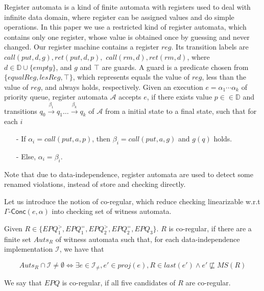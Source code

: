 Register automata is a kind of finite automata with registers used to deal with infinite data domain, where register can be assigned values and do simple operations. In this paper we use a restricted kind of register automata, which contains only one register, whose value is obtained once by guessing and never changed. Our register machine contains a register $\textit{reg}$. Its transition labels are $\textit{call}(\textit{put},d,g), \textit{ret}(\textit{put},d,p),$ $\textit{call}(\textit{rm},d),\textit{ret}(\textit{rm},d)$, where $d \in \mathbb{D} \cup \{ \textit{empty} \}$, and $g$ and $\top$ are guards. A guard is a predicate chosen from $\{\textit{equalReg},\textit{lesReg},\top \}$, which represents equals the value of $\textit{reg}$, less than the value of $\textit{reg}$, and always holds, respectively. Given an execution $e = \alpha_1 \cdots \alpha_k$ of priority queue, register automata $\mathcal{A}$ accepts $e$, if there exists value $p \in \in \mathbb{D}$ and transitions $q_0 \xrightarrow{\beta_1} q_1 \ldots \xrightarrow{\beta_k} q_k$ of $\mathcal{A}$ from a initial state to a final state, such that for each $i$

\begin{itemize}
\setlength{\itemsep}{0.5pt}
\item[-] If $\alpha_i = \textit{call}(\textit{put},a,p)$, then $\beta_i= \textit{call}(\textit{put},a,g)$ and $g(q)$ holds. 

\item[-] Else, $\alpha_i = \beta_i$. 
\end{itemize}

Note that due to data-independence, register automata are used to detect some renamed violations, instead of store and checking directly. 




Let us introduce the notion of co-regular, which reduce checking linearizable w.r.t $\Gamma\mathsf{\text{-}Conc}(e,\alpha)$ into checking set of witness automata.

\begin{definition}\label{def:co-regular of rules of extended priority queues}
Given $R \in \{ \textit{EPQ}_1^{>}, \textit{EPQ}_1^{=}, \textit{EPQ}_2^{>}, \textit{EPQ}_2^{=}, \textit{EPQ}_3 \}$. $R$ is co-regular, if there are a finite set $\textit{Auts}_{R}$ of witness automata such that, for each data-independence implementation $\mathcal{I}$, we have that

$$\textit{Auts}_{R} \cap \mathcal{I} \neq \emptyset \Leftrightarrow \exists e \in \mathcal{I}_{\neq},e' \in \textit{proj}(e), R \in last(e') \wedge e' \not\sqsubseteq \textit{MS}(R)$$

We say that $\textit{EPQ}$ is co-regular, if all five candidates of $R$ are co-regular.
\end{definition}

